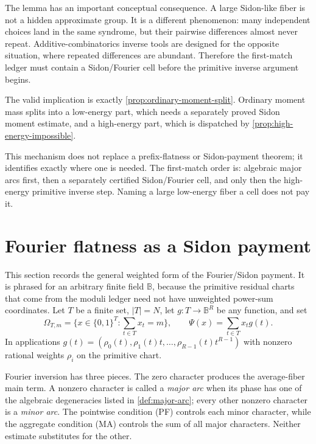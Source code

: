 \documentclass[12pt,a4paper]{amsart}
\numberwithin{equation}{section}
\theoremstyle{remark}
\newcommand{\B}{\mathbb B}
\newcommand{\abs}[1]{\lvert #1\rvert}
\begin{document}
The lemma has an important conceptual consequence.  A large Sidon-like fiber is not a hidden approximate group.  It is a different phenomenon: many independent choices land in the same syndrome, but their pairwise differences almost never repeat.  Additive-combinatorics inverse tools are designed for the opposite situation, where repeated differences are abundant.  Therefore the first-match ledger must contain a Sidon/Fourier cell before the primitive inverse argument begins.

The valid implication is exactly \cref{prop:ordinary-moment-split}.  Ordinary
moment mass splits into a low-energy part, which needs a separately proved
Sidon moment estimate, and a high-energy part, which is dispatched by
\cref{prop:high-energy-impossible}.

This mechanism does not replace a prefix-flatness or Sidon-payment theorem;
it identifies exactly where one is needed.  The first-match order is:
algebraic major arcs first, then a separately certified Sidon/Fourier cell,
and only then the high-energy primitive inverse step.  Naming a large
low-energy fiber a cell does not pay it.

\section{Fourier flatness as a Sidon payment}\label{sec:fourier}\label{sec:sidon-closure}

This section records the general weighted form of the Fourier/Sidon payment.  It is phrased for an arbitrary finite field \(\B\), because the primitive residual charts that come from the moduli ledger need not have unweighted power-sum coordinates.  Let \(T\) be a finite set, \(\abs T=N\), let \(g:T\to\B^R\) be any function, and set
\[
        \Omega_{T,m}=\{x\in\{0,1\}^T: \sum_{t\in T}x_t=m\},
        \qquad
        \Psi(x)=\sum_{t\in T}x_tg(t).
\]
In applications \(g(t)=(\rho_0(t),\rho_1(t)t,\ldots,\rho_{R-1}(t)t^{R-1})\) with nonzero rational weights \(\rho_i\) on the primitive chart.

Fourier inversion has three pieces.  The zero character produces the
average-fiber main term.  A nonzero character is called a \emph{major
arc} when its phase has one of the algebraic degeneracies listed in
\cref{def:major-arc}; every other nonzero character is a \emph{minor arc}.
The pointwise condition \textup{(PF)} controls each minor character, while
the aggregate condition \textup{(MA)} controls the sum of all major
characters.  Neither estimate substitutes for the other.
\end{document}
